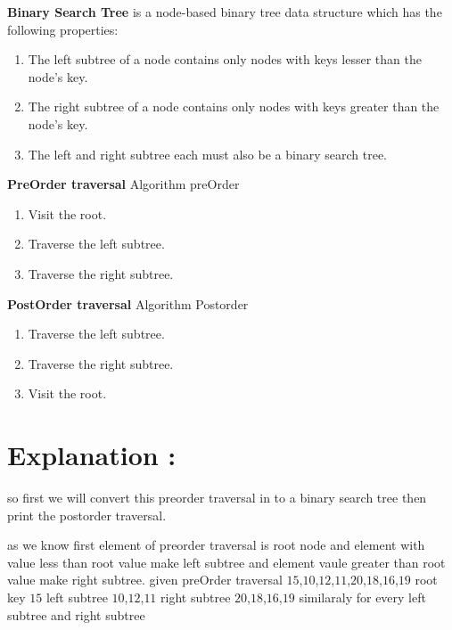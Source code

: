 \documentclass[journal,12pt,twocolumn]{IEEEtran}
\begin{document}
\textbf{Binary Search Tree} is a node-based binary tree data structure which has the following properties:
\begin{enumerate}
    \item The left subtree of a node contains only nodes with keys lesser than the node’s key.
    \item The right subtree of a node contains only nodes with keys greater than the node’s key.
    \item The left and right subtree each must also be a binary search tree.
\end{enumerate}
\textbf{PreOrder traversal} 
\newline
 Algorithm preOrder
 \begin{enumerate}
     \item Visit the root.
     \item Traverse the left subtree.
     \item Traverse the right subtree.
 \end{enumerate}
 \textbf{PostOrder traversal} 
 \newline
 Algorithm Postorder
 \begin{enumerate}
     \item Traverse the left subtree.
     \item Traverse the right subtree.
     \item Visit the root.
 \end{enumerate}
\section{Explanation : } 
 so  first we will convert this preorder traversal in to a binary search tree then print the postorder traversal.
 
 as we know first element of preorder traversal is root node and element with value less than root value make left subtree and element vaule greater than root value make right subtree.
 \vspace{5mm}
 \newline
 given preOrder traversal $15$,$10$,$12$,$11$,$20$,$18$,$16$,$19$
\newline
root key      $15$
\newline
left subtree  $10$,$12$,$11$
\newline
right subtree $20$,$18$,$16$,$19$
\newline
similaraly for every left subtree and right subtree
\vspace{5mm}
\end{document}
